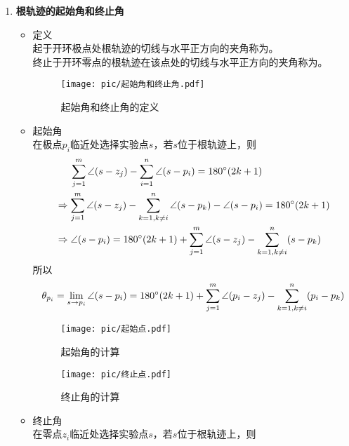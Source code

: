 \begin{enumerate}
	\item \textbf{根轨迹的起始角和终止角}
	\begin{itemize}
		\item 定义\\
		起于开环极点处根轨迹的切线与水平正方向的夹角称为。\\
		终止于开环零点的根轨迹在该点处的切线与水平正方向的夹角称为。
		\begin{figure}[!htb]
			\centering
			\texttt{[image: pic/起始角和终止角.pdf]}
			\caption{起始角和终止角的定义}
		\end{figure}
		\item 起始角\\
		在极点$p_i$临近处选择实验点$s$，若$s$位于根轨迹上，则
		\begin{align*}
			& \quad \,\,\, \sum_{j = 1}^{m}\angle (s - z_j) - \sum_{i = 1}^{n} \angle(s - p_i) = 180 {}^{\circ} (2k + 1)\\
			&\Rightarrow 	\sum_{j = 1}^{m}\angle (s - z_j) - \sum_{k = 1, k \neq i }^{n} \angle(s - p_k)  - \angle (s - p_i) = 180 {}^{\circ} (2k + 1) \\
			&\Rightarrow \angle (s - p_i) = 180 {}^{\circ} (2k + 1) + \sum_{j = 1}^{m}\angle (s - z_j) - \sum_{k = 1, k \neq i }^{n} (s - p_k) 
		\end{align*}
		所以
	\begin{align}
		\theta_{p_i} = \lim\limits_{s \to p_i} \angle (s - p_i) =  180 {}^{\circ} (2k + 1) + \sum_{j = 1}^{m}\angle (p_i - z_j) - \sum_{k = 1, k \neq i }^{n} (p_i - p_k) 
	\end{align}
	\vspace*{-1em}
	\begin{figure}[!htb]
		\begin{center}
			\begin{minipage}{0.45\linewidth}
				\centering
				\texttt{[image: pic/起始点.pdf]}
				\caption{起始角的计算}
			\end{minipage}
			\begin{minipage}{0.45\linewidth}
				\centering
				\texttt{[image: pic/终止点.pdf]}
				\caption{终止角的计算}
			\end{minipage}
		\end{center}
	\end{figure}
	\vspace*{-1em}
	\item 终止角\\
	在零点$z_i$临近处选择实验点$s$，若$s$位于根轨迹上，则

\end{itemize}
\end{enumerate}
